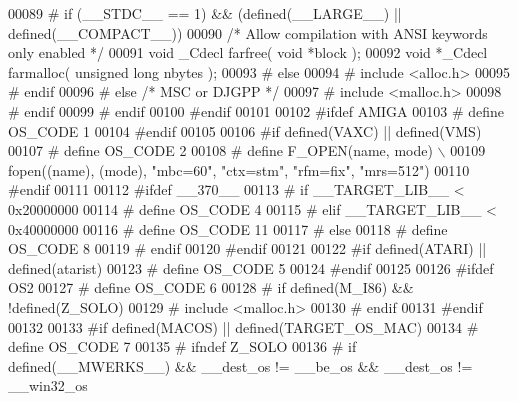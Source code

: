 \begin{DoxyCode}
00089 \textcolor{preprocessor}{#      if (\_\_STDC\_\_ == 1) && (defined(\_\_LARGE\_\_) || defined(\_\_COMPACT\_\_))}
00090          \textcolor{comment}{/* Allow compilation with ANSI keywords only enabled */}
00091          \textcolor{keywordtype}{void} \_Cdecl farfree( \textcolor{keywordtype}{void} *block );
00092          \textcolor{keywordtype}{void} *\_Cdecl farmalloc( \textcolor{keywordtype}{unsigned} \textcolor{keywordtype}{long} nbytes );
00093 \textcolor{preprocessor}{#      else}
00094 \textcolor{preprocessor}{#        include <alloc.h>}
00095 \textcolor{preprocessor}{#      endif}
00096 \textcolor{preprocessor}{#    else }\textcolor{comment}{/* MSC or DJGPP */}\textcolor{preprocessor}{}
00097 \textcolor{preprocessor}{#      include <malloc.h>}
00098 \textcolor{preprocessor}{#    endif}
00099 \textcolor{preprocessor}{#  endif}
00100 \textcolor{preprocessor}{#endif}
00101 
00102 \textcolor{preprocessor}{#ifdef AMIGA}
00103 \textcolor{preprocessor}{#  define OS\_CODE  1}
00104 \textcolor{preprocessor}{#endif}
00105 
00106 \textcolor{preprocessor}{#if defined(VAXC) || defined(VMS)}
00107 \textcolor{preprocessor}{#  define OS\_CODE  2}
00108 \textcolor{preprocessor}{#  define F\_OPEN(name, mode) \(\backslash\)}
00109 \textcolor{preprocessor}{     fopen((name), (mode), "mbc=60", "ctx=stm", "rfm=fix", "mrs=512")}
00110 \textcolor{preprocessor}{#endif}
00111 
00112 \textcolor{preprocessor}{#ifdef \_\_370\_\_}
00113 \textcolor{preprocessor}{#  if \_\_TARGET\_LIB\_\_ < 0x20000000}
00114 \textcolor{preprocessor}{#    define OS\_CODE 4}
00115 \textcolor{preprocessor}{#  elif \_\_TARGET\_LIB\_\_ < 0x40000000}
00116 \textcolor{preprocessor}{#    define OS\_CODE 11}
00117 \textcolor{preprocessor}{#  else}
00118 \textcolor{preprocessor}{#    define OS\_CODE 8}
00119 \textcolor{preprocessor}{#  endif}
00120 \textcolor{preprocessor}{#endif}
00121 
00122 \textcolor{preprocessor}{#if defined(ATARI) || defined(atarist)}
00123 \textcolor{preprocessor}{#  define OS\_CODE  5}
00124 \textcolor{preprocessor}{#endif}
00125 
00126 \textcolor{preprocessor}{#ifdef OS2}
00127 \textcolor{preprocessor}{#  define OS\_CODE  6}
00128 \textcolor{preprocessor}{#  if defined(M\_I86) && !defined(Z\_SOLO)}
00129 \textcolor{preprocessor}{#    include <malloc.h>}
00130 \textcolor{preprocessor}{#  endif}
00131 \textcolor{preprocessor}{#endif}
00132 
00133 \textcolor{preprocessor}{#if defined(MACOS) || defined(TARGET\_OS\_MAC)}
00134 \textcolor{preprocessor}{#  define OS\_CODE  7}
00135 \textcolor{preprocessor}{#  ifndef Z\_SOLO}
00136 \textcolor{preprocessor}{#    if defined(\_\_MWERKS\_\_) && \_\_dest\_os != \_\_be\_os && \_\_dest\_os != \_\_win32\_os}

\end{DoxyCode}
